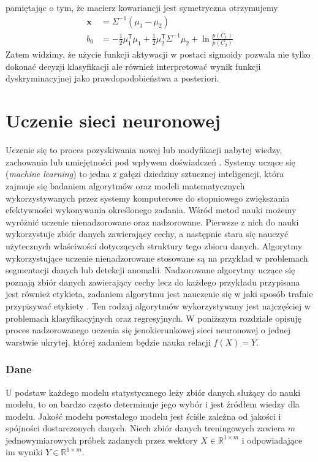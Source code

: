 \documentclass[11pt]{book}
\theoremstyle{definition}
\begin{document}
%
pamiętając o tym, że macierz kowariancji jest symetryczna otrzymujemy
%
\begin{subequations}
	\begin{align}
	\mathbf{x} &= \Sigma^{-1} \left(\mu_1 - \mu_2\right)\\
	b_0 &= - \frac{1}{2} \mu_1^\mathsf{T}\mu_1 + \frac{1}{2} \mu_2^\mathsf{T} \Sigma^{-1} \mu_2 + \ln \frac{p(C_1)}{p(C_2)}
	\end{align}
\end{subequations}
%
Zatem widzimy, że użycie funkcji aktywacji w postaci sigmoidy pozwala nie tylko dokonać decyzji klasyfikacji ale również interpretować wynik funkcji dyskryminacyjnej jako prawdopodobieństwa a posteriori.
%


\section{Uczenie sieci neuronowej}


Uczenie się to proces pozyskiwania nowej lub modyfikacji nabytej wiedzy, zachowania lub umiejętności pod wpływem doświadczeń \cite{2008:Biologia}. Systemy uczące się (\textit{machine learning}) to jedna z gałęzi dziedziny sztucznej inteligencji, która zajmuje się badaniem algorytmów oraz modeli matematycznych wykorzystywanych przez systemy komputerowe do stopniowego zwiększania efektywności wykonywania określonego zadania. Wśród metod nauki możemy wyróżnić uczenie nienadzorowane oraz nadzorowane. Pierwsze z nich do nauki wykorzystuje zbiór danych zawierający cechy, a następnie stara się nauczyć użytecznych właściwości dotyczących struktury tego zbioru danych. Algorytmy wykorzystujące uczenie nienadzorowane stosowane są na przykład w problemach segmentacji danych lub detekcji anomalii. Nadzorowane algorytmy uczące się poznają zbiór danych zawierający cechy lecz do każdego przykładu przypisana jest również etykieta, zadaniem algorytmu jest nauczenie się w jaki sposób trafnie przypisywać etykiety \cite{Goodfellow-et-al-2016}. Ten rodzaj algorytmów wykorzystywany jest najczęściej w problemach klasyfikacyjnych oraz regresyjnych. W poniższym rozdziale opisuję proces nadzorowanego uczenia się jenokierunkowej sieci neuronowej o jednej warstwie ukrytej, której zadaniem będzie nauka relacji $f(X)  = Y$.


\subsubsection{Dane}

U podstaw każdego modelu statystycznego leży zbiór danych służący do nauki modelu, to on bardzo często determinuje jego wybór i jest źródłem wiedzy dla modelu. Jakość modelu powstałego modelu jest ściśle zależna od jakości i spójności dostarczonych danych. Niech zbiór danych treningowych zawiera $m$ jednowymiarowych próbek zadanych przez wektory $X \in \mathbb{R}^{1\times m}$ i odpowiadające im wyniki $Y\in \mathbb{R}^{1\times m}$.
\end{document}
